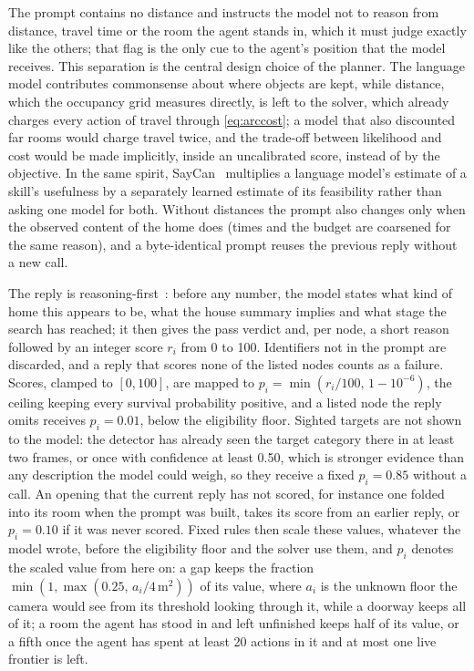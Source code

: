 \documentclass[10pt]{article}
\begin{document}
The prompt contains no distance and instructs the model not to reason from distance, travel time or the room the agent stands in, which it must judge exactly like the others; that flag is the only cue to the agent's position that the model receives. This separation is the central design choice of the planner. The language model contributes commonsense about where objects are kept, while distance, which the occupancy grid measures directly, is left to the solver, which already charges every action of travel through \cref{eq:arccost}; a model that also discounted far rooms would charge travel twice, and the trade-off between likelihood and cost would be made implicitly, inside an uncalibrated score, instead of by the objective. In the same spirit, SayCan~\citep{ichter2023do} multiplies a language model's estimate of a skill's usefulness by a separately learned estimate of its feasibility rather than asking one model for both. Without distances the prompt also changes only when the observed content of the home does (times and the budget are coarsened for the same reason), and a byte-identical prompt reuses the previous reply without a new call.

The reply is reasoning-first~\citep{wei2022chain}: before any number, the model states what kind of home this appears to be, what the house summary implies and what stage the search has reached; it then gives the pass verdict and, per node, a short reason followed by an integer score $r_i$ from 0 to 100. Identifiers not in the prompt are discarded, and a reply that scores none of the listed nodes counts as a failure. Scores, clamped to $[0,100]$, are mapped to $p_i=\min(r_i/100,\,1-10^{-6})$, the ceiling keeping every survival probability positive, and a listed node the reply omits receives $p_i=0.01$, below the eligibility floor. Sighted targets are not shown to the model: the detector has already seen the target category there in at least two frames, or once with confidence at least 0.50, which is stronger evidence than any description the model could weigh, so they receive a fixed $p_i=0.85$ without a call. An opening that the current reply has not scored, for instance one folded into its room when the prompt was built, takes its score from an earlier reply, or $p_i=0.10$ if it was never scored. Fixed rules then scale these values, whatever the model wrote, before the eligibility floor and the solver use them, and $p_i$ denotes the scaled value from here on: a gap keeps the fraction $\min(1,\max(0.25,\,a_i/4\,\mathrm{m}^2))$ of its value, where $a_i$ is the unknown floor the camera would see from its threshold looking through it, while a doorway keeps all of it; a room the agent has stood in and left unfinished keeps half of its value, or a fifth once the agent has spent at least 20 actions in it and at most one live frontier is left.
\end{document}
